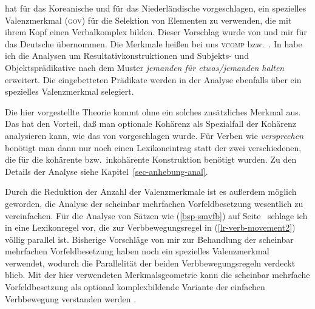 \citet*{Chung93a} hat für das Koreanische
und \citet*{Rentier94} für das Niederländische vorgeschlagen,
ein spezielles Valenzmerkmal (\textsc{gov}) für die Selektion von Elementen zu verwenden,
die mit ihrem Kopf einen Verbalkomplex bilden. Dieser Vorschlag wurde
von \citet{Kathol98b,Kathol2000a} und mir \citep{Mueller97c,Mueller99a} für das Deutsche übernommen.
Die Merkmale heißen bei uns \textsc{vcomp} bzw.\ \xcomp.
In  habe ich die Analysen um Resultativkonstruktionen und Subjekts- und
Objektsprädikative nach dem Muster \emph{jemanden für etwas/jemanden halten} erweitert.
Die eingebetteten Prädikate werden in der Analyse ebenfalls über ein spezielles Valenzmerkmal selegiert.

Die hier vorgestellte Theorie kommt ohne ein solches zusätzliches Merkmal aus.
Das hat den Vorteil, daß man optionale Kohärenz als Spezialfall der Kohärenz analysieren
kann, wie das von \citet{Kiss95a} vorgeschlagen wurde. Für Verben wie \emph{versprechen}
benötigt man dann nur noch einen Lexikoneintrag statt der zwei verschiedenen, die für
die kohärente bzw.\ inkohärente Konstruktion benötigt wurden. Zu den Details der Analyse siehe
Kapitel~\ref{sec-anhebung-anal}.

Durch die Reduktion der Anzahl der Valenzmerkmale ist es außerdem möglich geworden,
die Analyse der scheinbar mehrfachen Vorfeldbesetzung wesentlich zu vereinfachen.
Für die Analyse von Sätzen wie (\ref{bsp-smvfb}) auf Seite~\pageref{bsp-smvfb} schlage ich in 
eine Lexikonregel vor, die zur Verbbewegungsregel in (\ref{lr-verb-movement2})
völlig parallel ist. Bisherige Vorschläge von mir zur Behandlung der 
scheinbar mehrfachen Vorfeldbesetzung \citep{Mueller2002f,Mueller2002c} haben
noch ein spezielles Valenzmerkmal verwendet, wodurch die Parallelität der beiden
Verbbewegungsregeln verdeckt blieb. Mit der hier verwendeten Merkmalsgeometrie kann
die scheinbar mehrfache Vorfeldbesetzung als optional komplexbildende Variante
der einfachen Verbbewegung verstanden werden \citep{Mueller2005d}.



